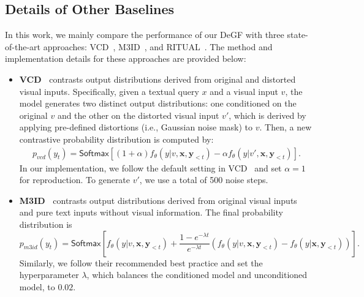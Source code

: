 \subsection{Details of Other Baselines}
In this work, we mainly compare the performance of our DeGF with three state-of-the-art approaches: VCD~\citep{leng2024mitigating}, M3ID~\citep{favero2024multi}, and RITUAL~\citep{woo2024ritual}. The method and implementation details for these approaches are provided below:
\begin{itemize}
\item \textbf{VCD~\citep{leng2024mitigating}} contrasts output distributions derived from original and distorted visual inputs. Specifically, given a textual query ${x}$ and a visual input ${v}$, the model generates two distinct output distributions: one conditioned on the original ${v}$ and the other on the distorted visual input ${v'}$, which is derived by applying pre-defined distortions (i.e., Gaussian noise mask) to ${v}$. 
Then, a new contrastive probability distribution is computed by:
\begin{gather}
p_{vcd}\left(y_t\right) =\mathsf{Softmax}\left[ (1+\alpha) 
f_\theta\left(y | v, \mathbf{x}, \mathbf{y}_{<t}\right) -\alpha f_\theta\left(y | v', \mathbf{x}, \mathbf{y}_{<t}\right)\right].
\end{gather}
In our implementation, we follow the default setting in VCD~\citep{leng2024mitigating} and set $\alpha=1$ for reproduction. To generate $v'$, we use a total of 500 noise steps.

\item \textbf{M3ID~\citep{favero2024multi}} contrasts output distributions derived from original visual inputs and pure text inputs without visual information. The final probability distribution is
\begin{equation}
    p_{m3id}\left(y_t\right) = \mathsf{Softmax}\left[f_\theta\left(y | v, \mathbf{x}, \mathbf{y}_{<t}\right) + \frac{1-e^{-\lambda t}}{e^{-\lambda t}} \left( f_\theta\left(y | v, \mathbf{x}, \mathbf{y}_{<t}\right) - f_\theta\left(y |  \mathbf{x}, \mathbf{y}_{<t}\right)\right) \right].
\end{equation}
Similarly, we follow their recommended best practice and set the hyperparameter $\lambda$, which balances the conditioned model and unconditioned model, to $0.02$.



\end{itemize}
